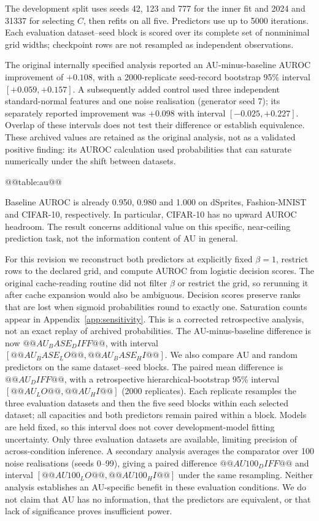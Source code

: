 The development split uses seeds 42, 123 and 777 for the inner fit and
2024 and 31337 for selecting $C$, then refits on all five. Predictors use
up to 5000 iterations. Each evaluation dataset--seed block is scored
over its complete set of nonminimal grid widths; checkpoint rows are
not resampled as independent observations.

The original internally specified analysis reported an AU-minus-baseline
AUROC improvement of $+0.108$, with a 2000-replicate seed-record bootstrap
95\% interval $[+0.059,+0.157]$. A subsequently added control used
three independent standard-normal features and one noise realisation
(generator seed 7); its separately reported improvement was $+0.098$
with interval $[-0.025,+0.227]$. Overlap of these intervals does not test
their difference or establish equivalence. These archived values are
retained as the original analysis, not as a validated positive finding:
its AUROC calculation used probabilities that can saturate numerically
under the shift between datasets.

@@table:au@@

Baseline AUROC is already 0.950, 0.980 and 1.000 on dSprites,
Fashion-MNIST and CIFAR-10, respectively. In particular, CIFAR-10 has
no upward AUROC headroom. The result concerns additional value on this
specific, near-ceiling prediction task, not the information content of
AU in general.

For this revision we reconstruct both predictors at explicitly fixed
$\beta=1$, restrict rows to the declared grid, and compute AUROC from
logistic decision scores. The original cache-reading routine did not
filter $\beta$ or restrict the grid, so rerunning it after cache expansion
would also be ambiguous. Decision scores preserve ranks that are lost
when sigmoid probabilities round to exactly one. Saturation counts
appear in Appendix~\ref{app:sensitivity}. This is a corrected retrospective
analysis, not an exact replay of archived probabilities. The
AU-minus-baseline difference is now $@@AU_BASE_DIFF@@$, with interval
$[@@AU_BASE_LO@@,@@AU_BASE_HI@@]$. We also compare AU and random
predictors on the same dataset--seed blocks.
The paired mean difference is $@@AU_DIFF@@$, with a retrospective
hierarchical-bootstrap 95\% interval $[@@AU_LO@@,@@AU_HI@@]$ (2000
replicates). Each replicate resamples the three evaluation datasets and
then the five seed blocks within each selected dataset; all capacities
and both predictors remain paired within a block. Models are held fixed,
so this interval does not cover development-model fitting uncertainty.
Only three evaluation datasets are available, limiting precision of
across-condition inference. A secondary analysis averages the comparator
over 100 noise realisations (seeds 0--99), giving a paired difference
$@@AU100_DIFF@@$ and interval $[@@AU100_LO@@,@@AU100_HI@@]$ under the
same resampling. Neither analysis establishes an AU-specific benefit in
these evaluation conditions. We do not claim that AU has no information,
that the predictors are equivalent, or that lack of significance proves
insufficient power.

